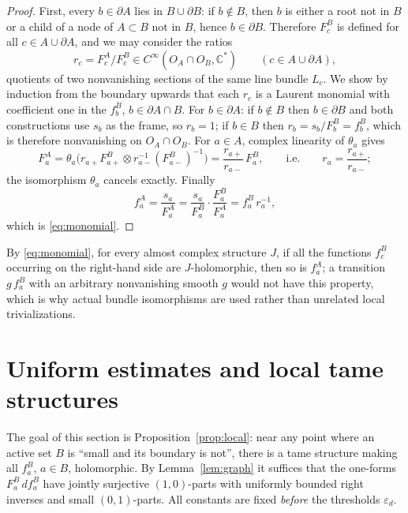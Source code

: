 \documentclass[11pt]{article}
\theoremstyle{remark}
\newcommand{\C}{\mathbb C}
\newcommand{\eps}{\varepsilon}
\begin{document}
\begin{proof}
First, every $b\in\partial A$ lies in $B\cup\partial B$: if $b\notin B$,
then $b$ is either a root not in $B$ or a child of a node of
$A\subset B$ not in $B$, hence $b\in\partial B$. Therefore $F^B_c$ is
defined for all $c\in A\cup\partial A$, and we may consider the ratios
\[
 r_c=F^A_c/F^B_c\in C^\infty(O_A\cap O_B,\C^*)
\qquad(c\in A\cup\partial A),
\]
quotients of two nonvanishing sections of the same line bundle $L_c$.
We show by induction from the boundary upwards that each $r_c$ is a
Laurent monomial with coefficient one in the $f^B_b$, $b\in\partial A\cap B$.
For $b\in\partial A$: if $b\notin B$ then $b\in\partial B$ and both
constructions use $s_b$ as the frame, so $r_b=1$; if $b\in B$ then
$r_b=s_b/F^B_b=f^B_b$, which is therefore nonvanishing on
$O_A\cap O_B$. For $a\in A$, complex linearity of $\theta_a$ gives
\[
 F^A_a=\theta_a\bigl(r_{a+}F^B_{a+}\otimes r_{a-}^{-1}(F^B_{a-})^{-1}\bigr)
 =\frac{r_{a+}}{r_{a-}}\,F^B_a,
 \qquad\text{i.e.}\qquad r_a=\frac{r_{a+}}{r_{a-}} ;
\]
the isomorphism $\theta_a$ cancels exactly. Finally
\[
 f^A_a=\frac{s_a}{F^A_a}=\frac{s_a}{F^B_a}\cdot\frac{F^B_a}{F^A_a}
 =f^B_a\,r_a^{-1},
\]
which is \eqref{eq:monomial}.
\end{proof}

By \eqref{eq:monomial}, for every almost complex structure $J$, if all
the functions $f^B_c$ occurring on the right-hand side are
$J$-holomorphic, then so is $f^A_a$; a transition $g\,f^B_a$ with an
arbitrary nonvanishing smooth $g$ would not have this property, which
is why actual bundle isomorphisms are used rather than unrelated local
trivializations.


\section{Uniform estimates and local tame structures}\label{sec:estimates}

The goal of this section is Proposition~\ref{prop:local}: near any
point where an active set $B$ is ``small and its boundary is not'',
there is a tame structure making all $f^B_a$, $a\in B$, holomorphic.
By Lemma~\ref{lem:graph} it suffices that the one-forms $F^B_a\,df^B_a$
have jointly surjective $(1,0)$-parts with uniformly bounded right
inverses and small $(0,1)$-parts. All constants are fixed \emph{before}
the thresholds $\eps_d$.
\end{document}
